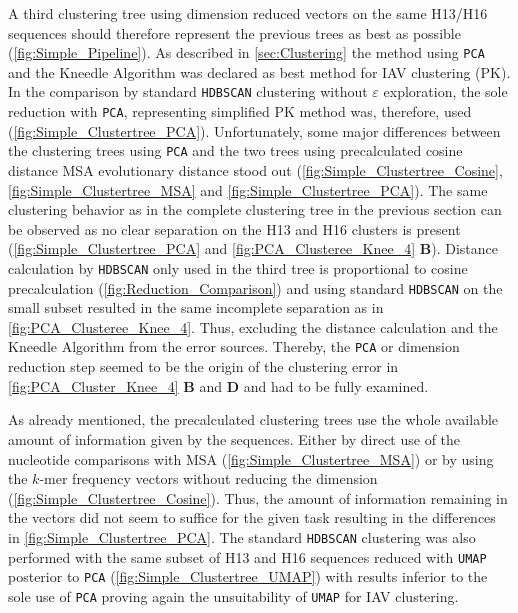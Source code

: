 A third clustering tree using dimension reduced vectors on the same H13/H16 sequences should therefore represent the previous trees as best as possible (\autoref{fig:Simple_Pipeline}). As described in \autoref{sec:Clustering} the method using \texttt{PCA} and the Kneedle Algorithm was declared as best method for \gls{IAV} clustering (PK). In the comparison by standard \texttt{HDBSCAN} clustering without $\varepsilon$ exploration, the sole reduction with \texttt{PCA}, representing simplified PK method was, therefore, used (\autoref{fig:Simple_Clustertree_PCA}). Unfortunately, some major differences between the clustering trees using \texttt{PCA} and the two trees using precalculated cosine distance \gls{MSA} evolutionary distance stood out (\autoref{fig:Simple_Clustertree_Cosine}, \autoref{fig:Simple_Clustertree_MSA} and \autoref{fig:Simple_Clustertree_PCA}). The same clustering behavior as in the complete clustering tree in the previous section can be observed as no clear separation on the H13 and H16 clusters is present (\autoref{fig:Simple_Clustertree_PCA} and \autoref{fig:PCA_Clusteree_Knee_4} \textbf{\textsf{B}}). Distance calculation by \texttt{HDBSCAN} only used in the third tree is proportional to cosine precalculation (\autoref{fig:Reduction_Comparison}) and using standard \texttt{HDBSCAN} on the small subset resulted in the same incomplete separation as in \autoref{fig:PCA_Clusteree_Knee_4}. Thus, excluding the distance calculation and the Kneedle Algorithm from the error sources. Thereby, the \texttt{PCA} or dimension reduction step seemed to be the origin of the clustering error in \autoref{fig:PCA_Cluster_Knee_4} \textbf{\textsf{B}} and \textbf{\textsf{D}} and had to be fully examined.

\vspace{1em}

As already mentioned, the precalculated clustering trees use the whole available amount of information given by the sequences. Either by direct use of the nucleotide comparisons with \gls{MSA} (\autoref{fig:Simple_Clustertree_MSA}) or by using the $k$-mer frequency vectors without reducing the dimension (\autoref{fig:Simple_Clustertree_Cosine}). Thus, the amount of information remaining in the vectors did not seem to suffice for the given task resulting in the differences in \autoref{fig:Simple_Clustertree_PCA}. The standard \texttt{HDBSCAN} clustering was also performed with the same subset of H13 and H16 sequences reduced with \texttt{UMAP} posterior to \texttt{PCA} (\autoref{fig:Simple_Clustertree_UMAP}) with results inferior to the sole use of \texttt{PCA} proving again the unsuitability of \texttt{UMAP} for \gls{IAV} clustering.%